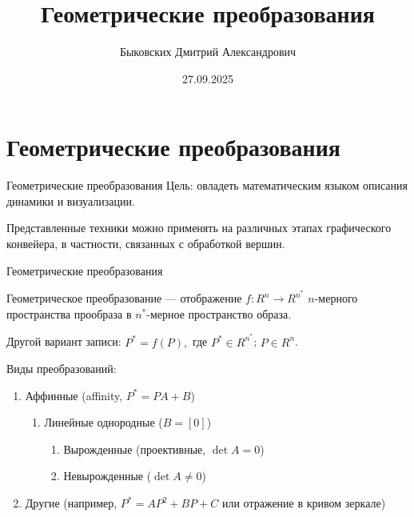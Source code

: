 \documentclass{beamer}
\title[Геометрические преобразования]{Геометрические преобразования}
\author[Быковских Д.А.]{Быковских Дмитрий Александрович}
\date{27.09.2025}
\begin{document}
	\begin{frame}
		\titlepage
	\end{frame}

	\section{Геометрические преобразования}

	\begin{frame}{Геометрические преобразования}
		Цель: овладеть математическим языком описания динамики и визуализации.

		Представленные техники можно применять на различных этапах графического конвейера, в частности, связанных с обработкой вершин.
	\end{frame}

	\begin{frame}{Геометрические преобразования}
				
		Геометрическое преобразование --- отображение $f:R^n \to R^{n^{*}}$ $n$-мерного пространства прообраза в $n^{*}$-мерное пространство образа.

		Другой вариант записи:	
		$
			P^{*}=f(P)
			,
		$
		где 
		$P^{*} \in R^{n^{*}}$;
		$P \in R^n $.
		
		Виды преобразований:
		\begin{enumerate}
			\item Аффинные (affinity, $P^{*} = P  A+B$)
				\begin{enumerate}
					\item Линейные однородные ($B = [0]$)
					\begin{enumerate}
						\item Вырожденные (проективные, $\det{A} = 0$)
						\item Невырожденные ($\det{A}\neq 0$)
					\end{enumerate}
				\end{enumerate}
			\item Другие (например, $P^{*}=A P^2+B P+ C$ или отражение в кривом зеркале)
		\end{enumerate}

\end{frame}
\end{document}
